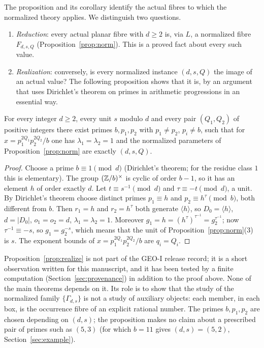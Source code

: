 The proposition and its corollary identify the actual fibres to which the normalized theory applies. We distinguish two questions.

\begin{enumerate}
\item \emph{Reduction}: every actual planar fibre with $d\ge2$ is, via $L$, a normalized fibre $F_{d,s,Q}$ (Proposition~\ref{prop:norm}). This is a proved fact about every such value.
\item \emph{Realization}: conversely, is every normalized instance $(d,s,Q)$ the image of an actual value? The following proposition shows that it is, by an argument that uses Dirichlet's theorem on primes in arithmetic progressions in an essential way.
\end{enumerate}

\begin{proposition}\label{prop:realize}
For every integer $d\ge2$, every unit $s$ modulo $d$ and every pair $(Q_1,Q_2)$ of positive integers there exist primes $b,p_1,p_2$ with $p_1\ne p_2$, $p_i\neq b$, such that for $x=p_1^{2Q_1}p_2^{2Q_2}/b$ one has $\lambda_1=\lambda_2=1$ and the normalized parameters of Proposition~\ref{prop:norm} are exactly $(d,s,Q)$.
\end{proposition}
\begin{proof}
Choose a prime $b\equiv1\pmod d$ (Dirichlet's theorem; for the residue class $1$ this is elementary). The group $(\mathbb Z/b)^\times$ is cyclic of order $b-1$, so it has an element $h$ of order exactly $d$. Let $t\equiv s^{-1}\pmod d$ and $\tau\equiv-t\pmod d$, a unit. By Dirichlet's theorem choose distinct primes $p_1\equiv h$ and $p_2\equiv h^\tau\pmod b$, both different from $b$. Then $r_1=h$ and $r_2=h^\tau$ both generate $\langle h\rangle$, so $D_0=\langle h\rangle$, $d=|D_0|$, $o_1=o_2=d$, $\lambda_1=\lambda_2=1$. Moreover $g_1=h=(h^\tau)^{\tau^{-1}}=g_2^{\tau^{-1}}$; now $\tau^{-1}\equiv-s$, so $g_1=g_2^{-s}$, which means that the unit of Proposition~\ref{prop:norm}(3) is $s$. The exponent bounds of $x=p_1^{2Q_1}p_2^{2Q_2}/b$ are $q_i=Q_i$.
\end{proof}

\begin{remark}\label{rem:realize-status}
Proposition~\ref{prop:realize} is not part of the GEO-I release record; it is a short observation written for this manuscript, and it has been tested by a finite computation (Section~\ref{sec:provenance}) in addition to the proof above. None of the main theorems depends on it. Its role is to show that the study of the normalized family $\{\Gamma_{d,s}\}$ is not a study of auxiliary objects: each member, in each box, is the occurrence fibre of an explicit rational number. The primes $b,p_1,p_2$ are chosen depending on $(d,s)$; the proposition makes no claim about a prescribed pair of primes such as $(5,3)$ (for which $b=11$ gives $(d,s)=(5,2)$, Section~\ref{sec:example}).
\end{remark}

